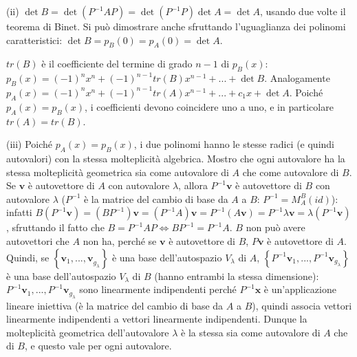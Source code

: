 \documentclass{article}
\begin{document}
(ii) $\det B=\det \left( P^{-1}AP\right) =\det \left( P^{-1}P\right) \det
A=\det A$, usando due volte il teorema di Binet. Si pu\`{o} dimostrare anche
sfruttando l'uguaglianza dei polinomi caratteristici: $\det B=p_{B}\left(
0\right) =p_{A}\left( 0\right) =\det A$.

$tr\left( B\right) $ \`{e} il coefficiente del termine di grado $n-1$ di $%
p_{B}\left( x\right) $: $p_{B}\left( x\right) =\left( -1\right)
^{n}x^{n}+\left( -1\right) ^{n-1}tr\left( B\right) x^{n-1}+...+\det B$.
Analogamente $p_{A}\left( x\right) =\left( -1\right) ^{n}x^{n}+\left(
-1\right) ^{n-1}tr\left( A\right) x^{n-1}+...+c_{1}x+\det A$. Poich\'{e} $%
p_{A}\left( x\right) =p_{B}\left( x\right) $, i coefficienti devono
coincidere uno a uno, e in particolare $tr\left( A\right) =tr\left( B\right) 
$.

(iii) Poich\'{e} $p_{A}\left( x\right) =p_{B}\left( x\right) $, i due
polinomi hanno le stesse radici (e quindi autovalori) con la stessa
molteplicit\`{a} algebrica. Mostro che ogni autovalore ha la stessa
molteplicit\`{a} geometrica sia come autovalore di $A$ che come autovalore
di $B$. Se $\mathbf{v}$ \`{e} autovettore di $A$ con autovalore $\lambda $,
allora $P^{-1}\mathbf{v}$ \`{e} autovettore di $B$ con autovalore $\lambda $
($P^{-1}$ \`{e} la matrice del cambio di base da $A$ a $B$: $%
P^{-1}=M_{A}^{B}\left( id\right) $): infatti $B\left( P^{-1}\mathbf{v}%
\right) =\left( BP^{-1}\right) \mathbf{v=}\left( P^{-1}A\right) \mathbf{v=}%
P^{-1}\left( A\mathbf{v}\right) =P^{-1}\lambda \mathbf{v=}\lambda \left(
P^{-1}\mathbf{v}\right) $, sfruttando il fatto che $B=P^{-1}AP%
\Longleftrightarrow BP^{-1}=P^{-1}A$. $B$ non pu\`{o} avere autovettori che $%
A$ non ha, perch\'{e} se $\mathbf{v}$ \`{e} autovettore di $B$, $P\mathbf{v}$
\`{e} autovettore di $A$. Quindi, se $\left\{ \mathbf{v}_{1}\mathbf{,...,v}%
_{g_{\lambda }}\right\} $ \`{e} una base dell'autospazio $V_{\lambda }$ di $%
A $, $\left\{ P^{-1}\mathbf{v}_{1}\mathbf{,...,}P^{-1}\mathbf{v}_{g_{\lambda
}}\right\} $ \`{e} una base dell'autospazio $V_{\lambda }$ di $B$ (hanno
entrambi la stessa dimensione): $P^{-1}\mathbf{v}_{1}\mathbf{,...,}P^{-1}%
\mathbf{v}_{g_{\lambda }}$ sono linearmente indipendenti perch\'{e} $P^{-1}%
\mathbf{x}$ \`{e} un'applicazione lineare iniettiva (\`{e} la matrice del
cambio di base da $A$ a $B$), quindi associa vettori linearmente
indipendenti a vettori linearmente indipendenti. Dunque la molteplicit\`{a}
geometrica dell'autovalore $\lambda $ \`{e} la stessa sia come autovalore di 
$A$ che di $B$, e questo vale per ogni autovalore.
\end{document}
